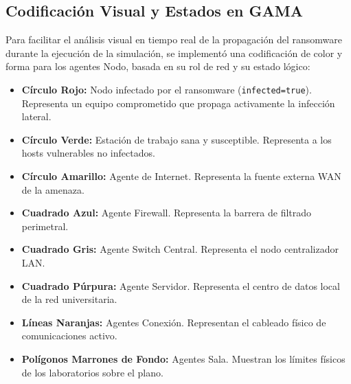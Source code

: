 \subsection{Codificación Visual y Estados en GAMA}
Para facilitar el análisis visual en tiempo real de la propagación del ransomware durante la ejecución de la simulación, se implementó una codificación de color y forma para los agentes Nodo, basada en su rol de red y su estado lógico:
\begin{itemize}
    \item \textbf{Círculo Rojo:} Nodo infectado por el ransomware (\texttt{infected}\allowbreak\texttt{=}\allowbreak\texttt{true}). Representa un equipo comprometido que propaga activamente la infección lateral.
    \item \textbf{Círculo Verde:} Estación de trabajo sana y susceptible. Representa a los hosts vulnerables no infectados.
    \item \textbf{Círculo Amarillo:} Agente de Internet. Representa la fuente externa WAN de la amenaza.
    \item \textbf{Cuadrado Azul:} Agente Firewall. Representa la barrera de filtrado perimetral.
    \item \textbf{Cuadrado Gris:} Agente Switch Central. Representa el nodo centralizador LAN.
    \item \textbf{Cuadrado Púrpura:} Agente Servidor. Representa el centro de datos local de la red universitaria.
    \item \textbf{Líneas Naranjas:} Agentes Conexión. Representan el cableado físico de comunicaciones activo.
    \item \textbf{Polígonos Marrones de Fondo:} Agentes Sala. Muestran los límites físicos de los laboratorios sobre el plano.
\end{itemize}

